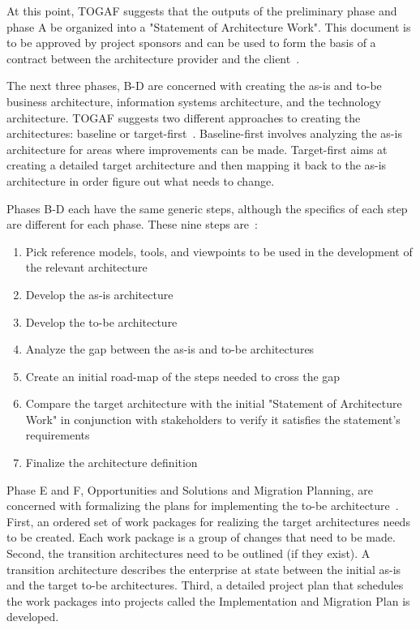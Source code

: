 At this point, TOGAF suggests that the outputs of the preliminary phase and phase A be organized into a "Statement of Architecture Work". This document is to be approved by project sponsors and can be used to form the basis of a contract between the architecture provider and the client~\cite{togaf9.1}.

The next three phases, B-D are concerned with creating the as-is and to-be business architecture, information systems architecture, and the technology architecture. TOGAF suggests two different approaches to creating the architectures: baseline or target-first~\cite{togaf9.1}. Baseline-first involves analyzing the as-is architecture for areas where improvements can be made. Target-first aims at creating a detailed target architecture and then mapping it back to the as-is architecture in order figure out what needs to change. 

Phases B-D each have the same generic steps, although the specifics of each step are different for each phase. These nine steps are~\cite{togaf9.1}:
\begin{enumerate}
    \item Pick reference models, tools, and viewpoints to be used in the development of the relevant architecture
    \item Develop the as-is architecture
    \item Develop the to-be architecture
    \item Analyze the gap between the as-is and to-be architectures
    \item Create an initial road-map of the steps needed to cross the gap
    \item Compare the target architecture with the initial "Statement of Architecture Work" in conjunction with stakeholders to verify it satisfies the statement's requirements
    \item Finalize the architecture definition
\end{enumerate}

Phase E and F, Opportunities and Solutions and Migration Planning, are concerned with formalizing the plans for implementing the to-be architecture~\cite{togaf9.1}. First, an ordered set of work packages for realizing the target architectures needs to be created. Each work package is a group of changes that need to be made. Second, the transition architectures need to be outlined (if they exist). A transition architecture describes the enterprise at state between the initial as-is and the target to-be architectures. Third, a detailed project plan that schedules the work packages into projects called the Implementation and Migration Plan is developed. 

